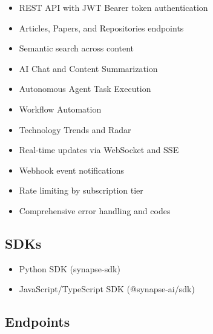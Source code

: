 \documentclass{report}
\begin{document}
\begin{itemize}
    \item REST API with JWT Bearer token authentication
    \item Articles, Papers, and Repositories endpoints
    \item Semantic search across content
    \item AI Chat and Content Summarization
    \item Autonomous Agent Task Execution
    \item Workflow Automation
    \item Technology Trends and Radar
    \item Real-time updates via WebSocket and SSE
    \item Webhook event notifications
    \item Rate limiting by subscription tier
    \item Comprehensive error handling and codes
\end{itemize}

\subsection{SDKs}

\begin{itemize}
    \item Python SDK (synapse-sdk)
    \item JavaScript/TypeScript SDK (@synapse-ai/sdk)
\end{itemize}

\subsection{Endpoints}
\end{document}

